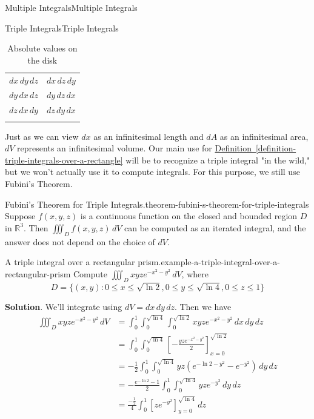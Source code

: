 \documentclass[10pt,]{book}
\numberwithin{equation}{section}
\newcommand{\hrulethick} {\noalign{\hrule height 0.11em}}
\newcommand{\RR}{\mathbb{R}}
\begin{document}
\begin{chapterptx}{Multiple Integrals}{}{Multiple Integrals}{}{}
\begin{sectionptx}{Triple Integrals}{}{Triple Integrals}{}{}
\begin{table}
\centering
\begin{tabular}{cc}\hrulethick
\(dx\,dy\,dz\)&\(dx\,dz\,dy\)\tabularnewline[0pt]
\(dy\,dx\,dz\)&\(dy\,dz\,dx\)\tabularnewline[0pt]
\(dz\,dx\,dy\)&\(dz\,dy\,dx\)\tabularnewline\hrulethick
\end{tabular}
\caption{Absolute values on the disk\label{table-volume-elements}}
\end{table}
 Just as we can view \(dx\) as an infinitesimal length and \(dA\) as an infinitesimal area, \(dV\) represents an infinitesimal volume.%
Our main use for \hyperref[definition-triple-integrals-over-a-rectangle]{Definition~\ref{definition-triple-integrals-over-a-rectangle}} will be to recognize a triple integral "in the wild," but we won't actually use it to compute integrals. For this purpose, we still use Fubini's Theorem.\begin{theorem}{Fubini's Theorem for Triple Integrals.}{}{theorem-fubini-s-theorem-for-triple-integrals}%
\hypertarget{p-1290}{}%
Suppose \(f(x,y,z)\) is a continuous function on the closed and bounded region \(D\) in \(\RR^{3}\). Then \(\iiint_{D}f(x,y,z)\,dV\) can be computed as an iterated integral, and the answer does not depend on the choice of \(dV\).%
\end{theorem}
\begin{example}{A triple integral over a rectangular prism.}{example-a-triple-integral-over-a-rectangular-prism}%
\hypertarget{p-1291}{}%
Compute \(\iiint_{D}xyze^{-x^{2} - y^{2}}\,dV\), where%
\begin{equation*}
D = \{(x,y) : 0\leq x\leq\sqrt{\ln2}, 0\leq y\leq\sqrt{\ln4}, 0\leq z\leq 1\}
\end{equation*}
%
\par\smallskip%
\noindent\textbf{Solution}.\hypertarget{solution-206}{}\quad%
\hypertarget{p-1292}{}%
We'll integrate using \(dV = dx\,dy\,dz\). Then we have%
\begin{align*}
\iiint_{D}xyze^{-x^{2} - y^{2}}\,dV & = \int_{0}^{1}\int_{0}^{\sqrt{\ln4}}\int_{0}^{\sqrt{\ln2}} xyze^{-x^{2} - y^{2}}\,dx\,dy\,dz \\
& = \int_{0}^{1}\int_{0}^{\sqrt{\ln4}}\left[-\frac{yze^{-x^{2} - y^{2}}}{2}\right]_{x=0}^{\sqrt{\ln2}} \\
& = -\frac{1}{2}\int_{0}^{1}\int_{0}^{\sqrt{\ln4}} yz(e^{-\ln2 - y^{2}} - e^{-y^{2}})\,dy\,dz \\
& = -\frac{e^{-\ln2} - 1}{2}\int_{0}^{1}\int_{0}^{\sqrt{\ln4}} yze^{-y^{2}}\,dy\,dz \\
& = \frac{-\frac{1}{2}}{4}\int_{0}^{1}\left[ze^{-y^{2}}\right]_{y=0}^{\sqrt{\ln4}}\,dz \\

\end{align*}
\end{example}
\end{sectionptx}
\end{chapterptx}
\end{document}
